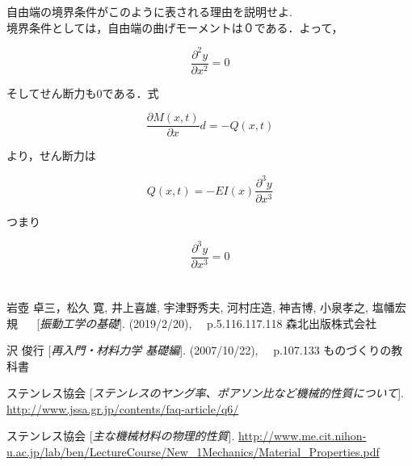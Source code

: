 \documentclass[twocolumn,xelatex,ja=standard,jafont=noto]{bxjsarticle}
\begin{document}
自由端の境界条件がこのように表される理由を説明せよ.\\


境界条件としては，自由端の曲げモーメントは０である．よって，



\begin{equation}
			 \frac{\partial^{2}y}{\partial x^{2}}=0
\end{equation}


そしてせん断力も0である．式

\begin{equation}
			 \frac{\partial M(x,t)}{\partial x}d=-Q(x,t)
\end{equation}

より，せん断力は

\begin{equation}
			Q(x,t)=-EI(x)\frac{\partial^{3}y}{\partial x^{3}}
\end{equation}


つまり


\begin{equation}
			 \frac{\partial^{3}y}{\partial x^{3}}=0
\end{equation}





\newpage


\section{}
\begin{thebibliography}{9}
岩壺 卓三，松久 寛, 井上喜雄, 宇津野秀夫, 河村庄造, 神吉博, 小泉孝之, 塩幡宏規 　
[\textit{振動工学の基礎}]. 
 (2019/2/20),  　p.5.116.117.118 森北出版株式会社

沢 俊行 
[\textit{再入門・材料力学 基礎編}]. 
(2007/10/22),  　p.107.133 ものづくりの教科書


ステンレス協会
[\textit{ステンレスのヤング率、ポアソン比など機械的性質について}]. 
\url{http://www.jssa.gr.jp/contents/faq-article/q6/}


ステンレス協会
[\textit{主な機械材料の物理的性質}]. 
\url{http://www.me.cit.nihon-u.ac.jp/lab/ben/LectureCourse/New_1Mechanics/Material_Properties.pdf}



\end{thebibliography}
\end{document}
